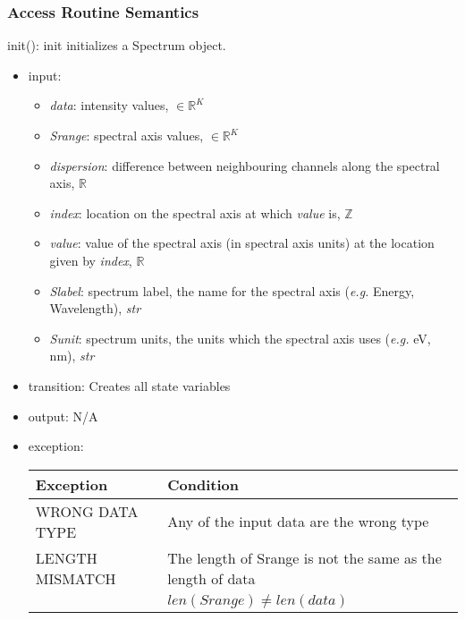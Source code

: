 \documentclass[12pt, titlepage]{article}
\begin{document}
\subsubsection{Access Routine Semantics}

\noindent init():
init initializes a Spectrum object.
\begin{itemize}
    \item input:
    \begin{itemize}
        \item \textit{data}: intensity values, $\in \mathbb{R}^K$
        \item \textit{Srange}: spectral axis values, $\in \mathbb{R}^K$
        \item \textit{dispersion}: difference  between neighbouring channels along the spectral axis,  $\mathbb{R}$
        \item \textit{index}: location on the spectral axis at which \textit{value} is, $\mathbb{Z}$
        \item \textit{value}: value of the spectral axis (in spectral axis units) at the location given by \textit{index}, $\mathbb{R}$
        \item \textit{Slabel}: spectrum label, the name for the spectral axis (\textit{e.g.} Energy, Wavelength), \textit{str}
        \item \textit{Sunit}: spectrum units, the units which the spectral axis uses (\textit{e.g.} \si{\electronvolt}, \si{\nano\metre}), \textit{str}
    \end{itemize}
    \item transition: Creates all state variables
    \item output: N/A
    \item exception:
\begin{center}
    \begin{tabular}{p{3cm} p{12cm}}
        \toprule[0.15em]
        \textbf{Exception} & \textbf{Condition}\\
        \midrule[0.1em]
        WRONG DATA TYPE & Any of the input data are the wrong type\\ 
        \midrule[0.05em]
        LENGTH MISMATCH & The length of Srange is not the same as the length of data\\
        & $len(Srange) \neq len(data)$\\
        \bottomrule[0.15em]
    \end{tabular}
\end{center}
\end{itemize}
\end{document}
